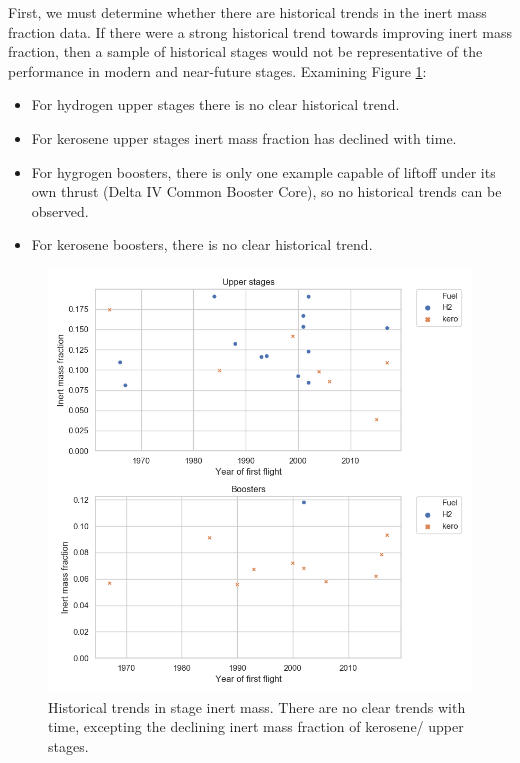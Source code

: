 \documentclass[conf]{../new-aiaa}
\begin{document}
 First, we must determine whether there are historical trends in the inert mass fraction data. If there were a strong historical trend towards improving inert mass fraction, then a sample of historical stages would not be representative of the performance in modern and near-future stages. Examining Figure \ref{fig:stage_historical_trends}:
 \begin{itemize}
    \item For hydrogen upper stages there is no clear historical trend.
    \item For kerosene upper stages inert mass fraction has declined with time.
    \item For hygrogen boosters, there is only one example capable of liftoff under its own thrust (Delta IV Common Booster Core), so no historical trends can be observed.
    \item For kerosene boosters, there is no clear historical trend.
\end{itemize}


\begin{figure}[hbt!]
    \centering
    \includegraphics[width=1\textwidth]{stage_trends/stage_historical_trends}
    \caption{\label{fig:stage_historical_trends} Historical trends in stage inert mass. There are no clear trends with time, excepting the declining inert mass fraction of kerosene/ upper stages.}
\end{figure}
\end{document}
